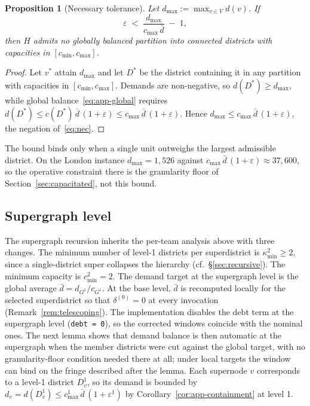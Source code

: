 \documentclass[preprint,12pt,authoryear]{elsarticle}
\newtheorem{proposition}[theorem]{Proposition}
\theoremstyle{definition}
\begin{document}
\begin{proposition}[Necessary tolerance]
\label{thm:nec}\label{thm:lower-bound}
Let $d_{\max} := \max_{v \in V} d(v)$. If
\begin{equation}\label{eq:nec}
    \varepsilon \;<\; \frac{d_{\max}}{c_{\max}\,\bar{d}} \;-\; 1,
\end{equation}
then $H$ admits no globally balanced partition into connected districts
with capacities in $[c_{\min}, c_{\max}]$.
\end{proposition}
\begin{proof}
Let $v^\ast$ attain $d_{\max}$ and let $D^\ast$ be the district containing
it in any partition with capacities in $[c_{\min}, c_{\max}]$. Demands are
non-negative, so $d(D^\ast) \geq d_{\max}$, while global
balance~\eqref{eq:app-global} requires
$d(D^\ast) \leq c(D^\ast)\,\bar d\,(1+\varepsilon)
\leq c_{\max}\,\bar d\,(1+\varepsilon)$. Hence
$d_{\max} \leq c_{\max}\,\bar d\,(1+\varepsilon)$, the negation
of~\eqref{eq:nec}.
\end{proof}
The bound binds only when a single unit outweighs the largest admissible
district. On the London instance $d_{\max} = 1{,}526$ against
$c_{\max}\,\bar d\,(1+\varepsilon) \approx 37{,}600$, so the operative
constraint there is the granularity floor of
Section~\ref{sec:capacitated}, not this bound.

\subsection*{Supergraph level}
\label{app:supergraph-correctness}\label{sec:supergraph}

The supergraph recursion inherits the per-team analysis above with
three changes. The minimum number of level-1 districts per superdistrict
is $\kappa^{2}_{\min} \geq 2$, since a single-district super
collapses the hierarchy (cf.~\S\ref{sec:recursive}). The minimum
capacity is $c_{\min}^{2} = 2$. The demand target at the supergraph
level is the global average $\bar{d} = d_{G^1}/c_{G^1}$. At the base level, $\bar{d}$ is recomputed locally for the selected superdistrict so that $\delta^{(0)} = 0$ at every invocation (Remark~\ref{rem:telescoping}). The implementation disables the debt term at the supergraph level (\texttt{debt = 0}), so the corrected windows coincide with the nominal ones. The next lemma shows that demand balance is then automatic at the supergraph when the member districts were cut against the global target, with no granularity-floor condition needed there at all; under local targets the window can bind on the fringe described after the lemma. Each supernode $v$
corresponds to a level-1 district $D^1_v$, so its demand is bounded
by $d_v = d(D^1_v) \leq c_{\max}^{1}\,\bar{d}\,(1+\varepsilon^{1})$
by Corollary~\ref{cor:app-containment} at level 1.
\end{document}
